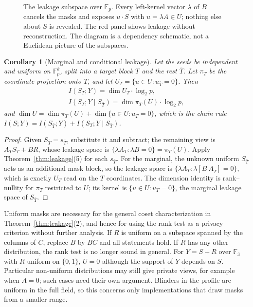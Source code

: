 \documentclass[pdflatex,sn-mathphys-num,twocolumn]{sn-jnl}
\theoremstyle{plain}
\newtheorem{corollary}[theorem]{Corollary}
\theoremstyle{definition}
\newcommand{\F}{\mathbb{F}}
\begin{document}
\begin{figure}[t]
\centering
\resizebox{\linewidth}{!}{}
\caption{The leakage subspace over $\mathbb F_p$. Every left-kernel vector $\lambda$ of $B$ cancels the masks and exposes $u\cdot S$ with $u=\lambda A\in U$; nothing else about $S$ is revealed. The red panel shows leakage without reconstruction. The diagram is a dependency schematic, not a Euclidean picture of the subspaces.}\label{fig:leakage}
\end{figure}

\begin{corollary}[Marginal and conditional leakage]\label{cor:condleak}
Let the seeds be independent and uniform on $\F_p^k$, split into a target block $T$ and the rest $\bar T$. Let $\pi_T$ be the coordinate projection onto $T$, and let $U_{T}=\{u\in U:u_{\bar T}=0\}$. Then
\begin{gather*}
 I(S_T;Y)=\dim U_T\cdot\log_2p,\\ I(S_T;Y\mid S_{\bar T})=\dim\pi_T(U)\cdot\log_2p,
\end{gather*}
and $\dim U=\dim\pi_T(U)+\dim\{u\in U:u_T=0\}$, which is the chain rule $I(S;Y)=I(S_{\bar T};Y)+I(S_T;Y\mid S_{\bar T})$.
\end{corollary}
\begin{proof}
Given $S_{\bar T}=s_{\bar T}$, substitute it and subtract; the remaining view is $A_TS_T+BR$, whose leakage space is $\{\lambda A_T:\lambda B=0\}=\pi_T(U)$. Apply Theorem~\ref{thm:leakage}(5) for each $s_{\bar T}$. For the marginal, the unknown uniform $S_{\bar T}$ acts as an additional mask block, so the leakage space is $\{\lambda A_T:\lambda[B\ A_{\bar T}]=0\}$, which is exactly $U_T$ read on the $T$ coordinates. The dimension identity is rank--nullity for $\pi_T$ restricted to $U$; its kernel is $\{u\in U:u_T=0\}$, the marginal leakage space of $S_{\bar T}$.
\end{proof}

Uniform masks are necessary for the general coset characterization in Theorem~\ref{thm:leakage}(2), and hence for using the rank test as a privacy criterion without further analysis. If $R$ is uniform on a subspace spanned by the columns of $C$, replace $B$ by $BC$ and all statements hold. If $R$ has any other distribution, the rank test is no longer sound in general. For $Y=S+R$ over $\F_3$ with $R$ uniform on $\{0,1\}$, $U=0$ although the support of $Y$ depends on $S$. Particular non-uniform distributions may still give private views, for example when $A=0$; such cases need their own argument. Blinders in the profile are uniform in the full field, so this concerns only implementations that draw masks from a smaller range.
\end{document}
